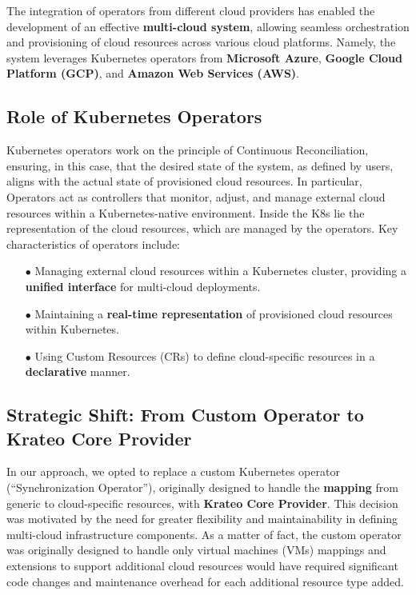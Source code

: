 The integration of operators from different cloud providers has enabled the development of an effective \textbf{multi-cloud system}, allowing seamless orchestration and provisioning of cloud resources across various cloud platforms. Namely, the system leverages Kubernetes operators from \textbf{Microsoft Azure}, \textbf{Google Cloud Platform (GCP)}, and \textbf{Amazon Web Services (AWS)}.

\subsection{Role of Kubernetes Operators}

Kubernetes operators work on the principle of Continuous Reconciliation, ensuring, in this case, that the desired state of the system, as defined by users, aligns with the actual state of provisioned cloud resources. In particular, Operators act as controllers that monitor, adjust, and manage external cloud resources within a Kubernetes-native environment. Inside the K8s lie the representation of the cloud resources, which are managed by the operators.
Key characteristics of operators include:
\begin{itemize}[itemsep=0.2pt, topsep=1pt]
  \item[$\bullet$] Managing external cloud resources within a Kubernetes cluster, providing a \textbf{unified interface} for multi-cloud deployments.
  \item[$\bullet$] Maintaining a \textbf{real-time representation} of provisioned cloud resources within Kubernetes.
  \item[$\bullet$] Using Custom Resources (CRs) to define cloud-specific resources in a \textbf{declarative} manner.
\end{itemize}

\subsection{Strategic Shift: From Custom Operator to Krateo Core Provider}

In our approach, we opted to replace a custom Kubernetes operator (``Synchronization Operator''), originally designed to handle the \textbf{mapping} from generic to cloud-specific resources, with \textbf{Krateo Core Provider}. This decision was motivated by the need for greater flexibility and maintainability in defining multi-cloud infrastructure components. As a matter of fact, the custom operator was originally designed to handle only virtual machines (VMs) mappings and extensions to support additional cloud resources would have required significant code changes and maintenance overhead for each additional resource type added.

